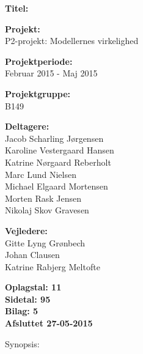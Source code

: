 \begin{minipage}[t]{0.48\textwidth}
\textbf{Titel:} \\[5pt]\bigskip\hspace{2ex}


\textbf{Projekt:} \\[5pt]\bigskip\hspace{2ex}
P2-projekt: Modellernes virkelighed

\textbf{Projektperiode:} \\[5pt]\bigskip\hspace{2ex}
Februar 2015 - Maj 2015

\textbf{Projektgruppe:} \\[5pt]\bigskip\hspace{2ex}
B149

\textbf{Deltagere:} \\[5pt]\hspace*{2ex}
Jacob Scharling Jørgensen \\\hspace*{2ex}
Karoline Vestergaard Hansen \\\hspace*{2ex}
Katrine Nørgaard Reberholt \\\hspace*{2ex}
Marc Lund Nielsen \\\hspace*{2ex}
Michael Elgaard Mortensen \\\hspace*{2ex}
Morten Rask Jensen \\\hspace*{2ex}
Nikolaj Skov Gravesen \\\bigskip\hspace{2ex}

\textbf{Vejledere:} \\[5pt]\hspace*{2ex}
Gitte Lyng Grønbech \\\hspace*{2ex}
Johan Clausen \\\hspace*{2ex}
Katrine Rabjerg Meltofte \\\bigskip\hspace{2ex}

\vspace*{0.5cm}

\textbf{Oplagstal: 11} \\
\textbf{Sidetal: 95} \\
\textbf{Bilag: 5} \\ 
\textbf{Afsluttet 27-05-2015}

\end{minipage}
\hfill
\begin{minipage}[t]{0.483\textwidth}
Synopsis: \\[5pt]
\fbox{\parbox{7cm}{\bigskip\bigskip}}
\end{minipage}

